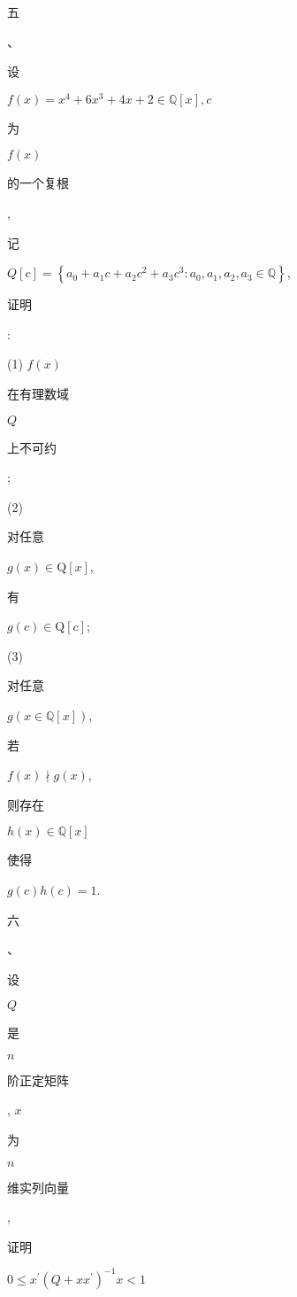 \documentclass[10pt]{article}
\begin{document}
\begin{CJK}{UTF8}{mj}五\end{CJK}、\begin{CJK}{UTF8}{mj}设\end{CJK} $f(x)=x^{4}+6 x^{3}+4 x+2 \in \mathbb{Q}[x], c$ \begin{CJK}{UTF8}{mj}为\end{CJK} $f(x)$ \begin{CJK}{UTF8}{mj}的一个复根\end{CJK}, \begin{CJK}{UTF8}{mj}记\end{CJK} $Q[c]=\left\{a_{0}+a_{1} c+a_{2} c^{2}+a_{3} c^{3}: a_{0}, a_{1}, a_{2}, a_{3} \in \mathbb{Q}\right\}$, \begin{CJK}{UTF8}{mj}证明\end{CJK}:

(1) $f(x)$ \begin{CJK}{UTF8}{mj}在有理数域\end{CJK} $Q$ \begin{CJK}{UTF8}{mj}上不可约\end{CJK};

(2) \begin{CJK}{UTF8}{mj}对任意\end{CJK} $g(x) \in \mathrm{Q}[x]$, \begin{CJK}{UTF8}{mj}有\end{CJK} $g(c) \in \mathrm{Q}[c]$;

(3) \begin{CJK}{UTF8}{mj}对任意\end{CJK} $g(x \in \mathbb{Q}[x])$, \begin{CJK}{UTF8}{mj}若\end{CJK} $f(x) \nmid g(x)$, \begin{CJK}{UTF8}{mj}则存在\end{CJK} $h(x) \in \mathbb{Q}[x]$ \begin{CJK}{UTF8}{mj}使得\end{CJK} $g(c) h(c)=1$.

\begin{CJK}{UTF8}{mj}六\end{CJK}、\begin{CJK}{UTF8}{mj}设\end{CJK} $Q$ \begin{CJK}{UTF8}{mj}是\end{CJK} $n$ \begin{CJK}{UTF8}{mj}阶正定矩阵\end{CJK}, $x$ \begin{CJK}{UTF8}{mj}为\end{CJK} $n$ \begin{CJK}{UTF8}{mj}维实列向量\end{CJK}, \begin{CJK}{UTF8}{mj}证明\end{CJK} $0 \leq x^{\prime}\left(Q+x x^{\prime}\right)^{-1} x<1$
\end{document}
